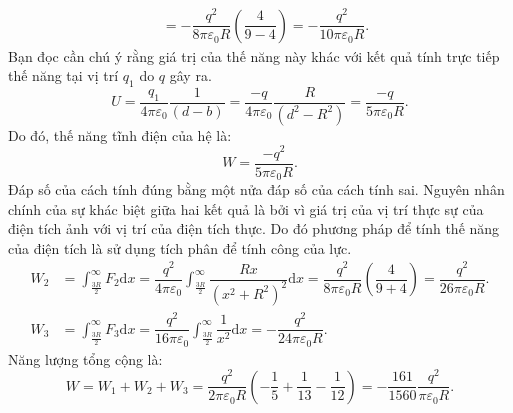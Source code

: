 \begin{loigiai}
\begin{align*}
    &=-\dfrac{q^2}{8\pi\varepsilon_0R}\left(\dfrac{4}{9-4}\right)=-\dfrac{q^2}{10\pi\varepsilon_0R}.
\end{align*}
Bạn đọc cần chú ý rằng giá trị của thế năng này khác với kết quả tính trực tiếp thế năng tại vị trí $q_1$ do $q$ gây ra.
\[U=\dfrac{q_1}{4\pi\varepsilon_0}\dfrac{1}{(d-b)}=\dfrac{-q}{4\pi\varepsilon_0}\dfrac{R}{(d^2-R^2)}=\dfrac{-q}{5\pi\varepsilon_0R}.\]
Do đó, thế năng tĩnh điện của hệ là:
\[W=\dfrac{-q^2}{5\pi\varepsilon_0R}.\]
Đáp số của cách tính đúng bằng một nửa đáp số của cách tính sai. Nguyên nhân chính của sự khác biệt giữa hai kết quả là bởi vì giá trị của vị trí thực sự của điện tích ảnh với vị trí của điện tích thực. Do đó phương pháp để tính thế năng của điện tích là sử dụng tích phân để tính công của lực.
\begin{align*}
    W_2&=\int_{\frac{3R}{2}}^{\infty}F_2\mathrm{d}x=\dfrac{q^2}{4\pi\varepsilon_0}\int_{\frac{3R}{2}}^{\infty}\dfrac{Rx}{(x^2+R^2)^2}\mathrm{d}x=\dfrac{q^2}{8\pi\varepsilon_0R}\left(\dfrac{4}{9+4}\right)=\dfrac{q^2}{26\pi\varepsilon_0R}.\\
    W_3&=\int_{\frac{3R}{2}}^{\infty}F_3\mathrm{d}x=\dfrac{q^2}{16\pi\varepsilon_0}\int_{\frac{3R}{2}}^{\infty}\dfrac{1}{x^2}\mathrm{d}x=-\dfrac{q^2}{24\pi\varepsilon_0R}.
\end{align*}
Năng lượng tổng cộng là:
\[W=W_1+W_2+W_3=\dfrac{q^2}{2\pi\varepsilon_0R}\left(-\dfrac{1}{5}+\dfrac{1}{13}-\dfrac{1}{12}\right)=-\dfrac{161}{1560}\dfrac{q^2}{\pi\varepsilon_0R}.\]
\end{loigiai}


